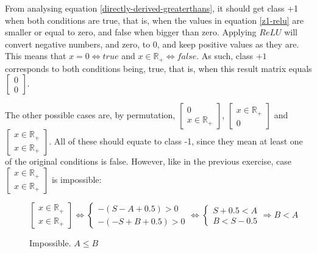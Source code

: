 \documentclass[12pt]{article}
\begin{document}
\begin{itemize}
        From analysing equation \ref{directly-derived-greaterthans}, it should get class +1 when both conditions are true, that is, when the values in equation \ref{z1-relu} are smaller or equal to zero, and false when bigger than zero. Applying $ReLU$ will convert negative numbers, and zero, to 0, and keep positive values as they are. This means that $x = 0 \Leftrightarrow true$ and $x \in \mathbb{R}_{+} \Leftrightarrow false$. As such, class $+1$ corresponds to both conditions being, true, that is, when this result matrix equals $\begin{bmatrix}0\\0\end{bmatrix}$.

            \newcommand{\rmais}{\mathbb{R}_{+}}
            The other possible cases are, by permutation, $\begin{bmatrix}0\\x\in\rmais\end{bmatrix}$, $\begin{bmatrix}x\in\rmais\\0\end{bmatrix}$ and $\begin{bmatrix}x\in\rmais\\x\in\rmais\end{bmatrix}$. All of these should equate to class -1, since they mean at least one of the original conditions is false. However, like in the previous exercise, case $\begin{bmatrix}x\in\rmais\\x\in\rmais\end{bmatrix}$ is impossible:

                \begin{figure}[H]
                    \[
                        \begin{bmatrix}
                        x\in\rmais\\
                        x\in\rmais
                    \end{bmatrix}
                    \Leftrightarrow
                        \begin{cases}
                            -(S-A+0.5) > 0 \\
                            -(-S + B + 0.5) > 0
                        \end{cases}
                        \Leftrightarrow
                        \begin{cases}
                            S+0.5 < A \\
                            B < S-0.5
                        \end{cases}
                        \Rightarrow
                        B < A
                    \]
                    \caption*{Impossible. $A \leq B$}
                \end{figure}


\end{itemize}
\end{document}
